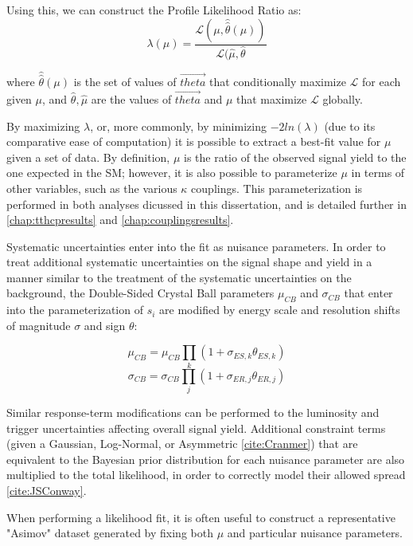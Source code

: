 Using this, we can construct the Profile Likelihood Ratio as: 
\begin{equation}
\lambda(\mu) = \frac{\mathcal{L}(\mu, \hat{\hat{\theta}}(\mu))} {\mathcal{L}(\hat{\mu}, \hat{\theta}}
\end{equation}

where $\hat{\hat{\theta}}(\mu)$ is the set of values of $\vec{theta}$ that conditionally maximize $\mathcal{L}$ for each given $\mu$, and $\hat{\theta}, \hat{\mu}$ are the values of $\vec{theta}$ and $\mu$ that maximize $\mathcal{L}$ globally.

By maximizing $\lambda$, or, more commonly, by minimizing $-2ln(\lambda)$ (due to its comparative ease of computation) it is possible to extract a best-fit value for $\mu$ given a set of data. By definition, $\mu$ is the ratio of the observed signal yield to the one expected in the SM; however, it is also possible to parameterize $\mu$ in terms of other variables, such as the various $\kappa$ couplings. This parameterization is performed in both analyses dicussed in this dissertation, and is detailed further in \ref{chap:tthcpresults} and \ref{chap:couplingsresults}.

Systematic uncertainties enter into the fit as nuisance parameters. In order to treat additional systematic uncertainties on the signal shape and yield in a manner similar to the treatment of the systematic uncertainties on the background, the Double-Sided Crystal Ball parameters $\mu_{CB}$ and $\sigma_{CB}$ that enter into the parameterization of $s_{i}$ are modified by energy scale and resolution shifts of magnitude $\sigma$ and sign $\theta$:

\begin{equation}
\mu_{CB} = \mu_{CB} \prod_{k} (1+\sigma_{ES,k}\theta_{ES,k}) 
\end{equation}
\begin{equation}
\sigma_{CB} = \sigma_{CB} \prod_{j} (1+\sigma_{ER,j}\theta_{ER,j}) 
\end{equation}

Similar response-term modifications can be performed to the luminosity and trigger uncertainties affecting overall signal yield. Additional constraint terms (given a Gaussian, Log-Normal, or Asymmetric \ref{cite:Cranmer}) that are equivalent to the Bayesian prior distribution for each nuisance parameter are also multiplied to the total likelihood, in order to correctly model their allowed spread \ref{cite:JSConway}.

When performing a likelihood fit, it is often useful to construct a representative "Asimov" dataset generated by fixing both $\mu$ and particular nuisance parameters.

